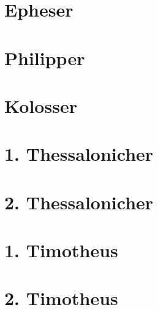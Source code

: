 \chapter{Epheser}
\begin{multicols}{2}
  \raggedcolumns
  \parskip=0pt \relax
  
\end{multicols}

\chapter{Philipper}
\begin{multicols}{2}
  \raggedcolumns
  \parskip=0pt \relax
  
\end{multicols}

\chapter{Kolosser}
\begin{multicols}{2}
  \raggedcolumns
  \parskip=0pt \relax
  
\end{multicols}

\chapter{1. Thessalonicher}
\begin{multicols}{2}
  \raggedcolumns
  \parskip=0pt \relax
  
\end{multicols}

\chapter{2. Thessalonicher}
\begin{multicols}{2}
  \raggedcolumns
  \parskip=0pt \relax
  
\end{multicols}

\chapter{1. Timotheus}
\begin{multicols}{2}
  \raggedcolumns
  \parskip=0pt \relax
  
\end{multicols}

\chapter{2. Timotheus}
\begin{multicols}{2}
  \raggedcolumns
  \parskip=0pt \relax
  
\end{multicols}

